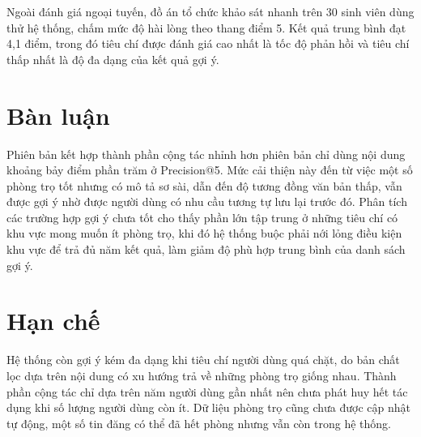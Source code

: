 Ngoài đánh giá ngoại tuyến, đồ án tổ chức khảo sát nhanh trên 30 sinh viên
dùng thử hệ thống, chấm mức độ hài lòng theo thang điểm 5. Kết quả trung
bình đạt 4,1 điểm, trong đó tiêu chí được đánh giá cao nhất là tốc độ phản
hồi và tiêu chí thấp nhất là độ đa dạng của kết quả gợi ý.

\section{Bàn luận}

Phiên bản kết hợp thành phần cộng tác nhỉnh hơn phiên bản chỉ dùng nội dung
khoảng bảy điểm phần trăm ở Precision@5. Mức cải thiện này đến từ việc một
số phòng trọ tốt nhưng có mô tả sơ sài, dẫn đến độ tương đồng văn bản thấp,
vẫn được gợi ý nhờ được người dùng có nhu cầu tương tự lưu lại trước đó.
Phân tích các trường hợp gợi ý chưa tốt cho thấy phần lớn tập trung ở những
tiêu chí có khu vực mong muốn ít phòng trọ, khi đó hệ thống buộc phải nới
lỏng điều kiện khu vực để trả đủ năm kết quả, làm giảm độ phù hợp trung
bình của danh sách gợi ý.

\section{Hạn chế}

\begin{luuy}
Hệ thống còn gợi ý kém đa dạng khi tiêu chí người dùng quá chặt, do bản chất
lọc dựa trên nội dung có xu hướng trả về những phòng trọ giống nhau. Thành
phần cộng tác chỉ dựa trên năm người dùng gần nhất nên chưa phát huy hết
tác dụng khi số lượng người dùng còn ít. Dữ liệu phòng trọ cũng chưa được
cập nhật tự động, một số tin đăng có thể đã hết phòng nhưng vẫn còn trong
hệ thống.
\end{luuy}
